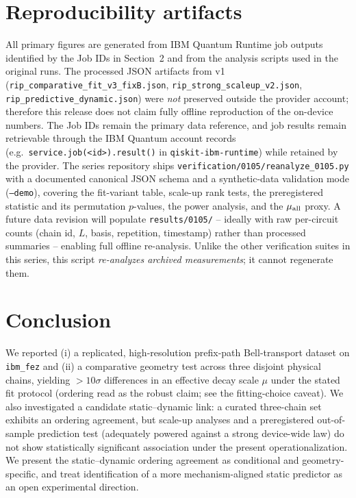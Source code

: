 \documentclass[11pt]{article}
\begin{document}
\section{Reproducibility artifacts}
\label{sec:repro}
All primary figures are generated from IBM Quantum Runtime job outputs
identified by the Job IDs in Section~2 and from the analysis scripts used in
the original runs. The processed JSON artifacts from v1
(\texttt{rip\_comparative\_fit\_v3\_fixB.json},
\texttt{rip\_strong\_scaleup\_v2.json},
\texttt{rip\_predictive\_dynamic.json}) were \emph{not} preserved outside
the provider account; therefore this release does not claim fully offline
reproduction of the on-device numbers. The Job IDs remain the primary data
reference, and job results remain retrievable through the IBM Quantum
account records (e.g.\ \texttt{service.job(<id>).result()} in
\texttt{qiskit-ibm-runtime}) while retained by the provider. The series
repository ships \texttt{verification/0105/reanalyze\_0105.py} with a
documented canonical JSON schema and a synthetic-data validation mode
(\texttt{--demo}), covering the fit-variant table, scale-up rank tests, the
preregistered statistic and its permutation $p$-values, the power analysis,
and the $\mu_{\rm all}$ proxy. A future data revision will populate
\texttt{results/0105/} -- ideally with raw per-circuit counts (chain id,
$L$, basis, repetition, timestamp) rather than processed summaries --
enabling full offline re-analysis. Unlike the other verification suites in
this series, this script \emph{re-analyzes archived measurements}; it
cannot regenerate them.

\section{Conclusion}
We reported (i) a replicated, high-resolution prefix-path Bell-transport
dataset on \texttt{ibm\_fez} and (ii) a comparative geometry test across
three disjoint physical chains, yielding $>10\sigma$ differences in an
effective decay scale $\mu$ under the stated fit protocol (ordering read as
the robust claim; see the fitting-choice caveat). We also investigated a candidate static--dynamic link: a
curated three-chain set exhibits an ordering agreement, but scale-up
analyses and a preregistered out-of-sample prediction test (adequately
powered against a strong device-wide law) do not show statistically significant association under the present
operationalization. We present the static--dynamic ordering agreement as
conditional and geometry-specific, and treat identification of a more
mechanism-aligned static predictor as an open experimental direction.
\end{document}
